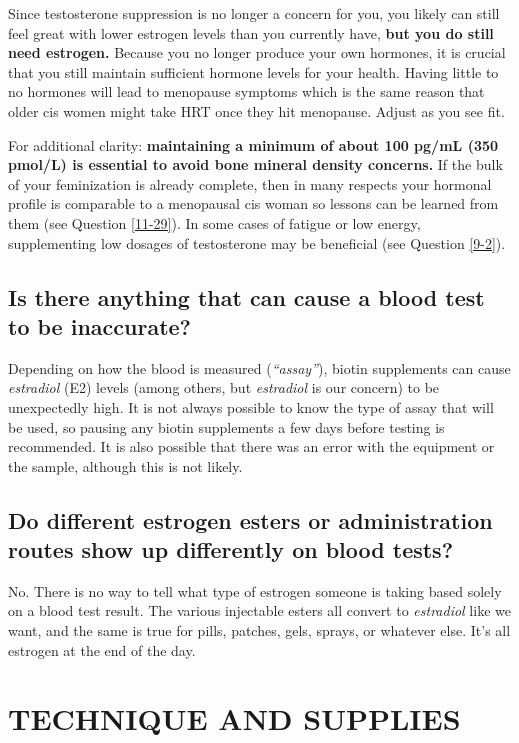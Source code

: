 \documentclass{article}
\begin{document}
Since testosterone suppression is no longer a concern for you, you likely can still feel great with lower estrogen levels than you currently have, \textbf{but you do still need estrogen.} Because you no longer produce your own hormones, it is crucial that you still maintain sufficient hormone levels for your health. Having little to no hormones will lead to menopause symptoms which is the same reason that older cis women might take HRT once they hit menopause. Adjust as you see fit.

For additional clarity: \textbf{maintaining a minimum of about 100 pg/mL (350 pmol/L) is essential to avoid bone mineral density concerns.} If the bulk of your feminization is already complete, then in many respects your hormonal profile is comparable to a menopausal cis woman so lessons can be learned from them (see Question \ref{11-29}). In some cases of fatigue or low energy, supplementing low dosages of testosterone may be beneficial (see Question \ref{9-2}).

\subsection{Is there anything that can cause a blood test to be inaccurate?}

Depending on how the blood is measured (\textit{“assay”}), biotin supplements can cause \textit{estradiol} (E2) levels (among others, but \textit{estradiol} is our concern) to be unexpectedly high. It is not always possible to know the type of assay that will be used, so pausing any biotin supplements a few days before testing is recommended. It is also possible that there was an error with the equipment or the sample, although this is not likely.

\subsection{Do different estrogen esters or administration routes show up differently on blood tests?}\label{4-16}

No. There is no way to tell what type of estrogen someone is taking based solely on a blood test result. The various injectable esters all convert to \textit{estradiol} like we want, and the same is true for pills, patches, gels, sprays, or whatever else. It's all estrogen at the end of the day.



\section{TECHNIQUE AND SUPPLIES}\label{ts}
\end{document}
